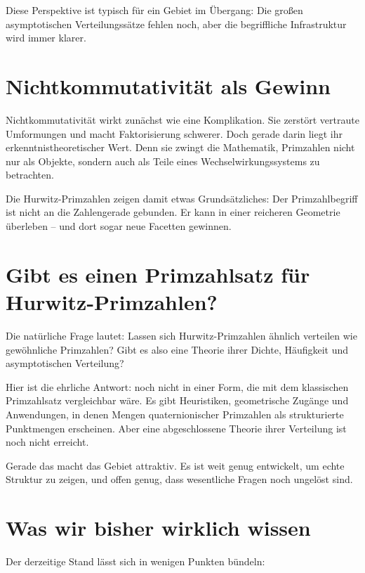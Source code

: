 \documentclass[11pt,a4paper]{article}
\begin{document}
	Diese Perspektive ist typisch für ein Gebiet im Übergang: Die großen asymptotischen Verteilungssätze fehlen noch, aber die begriffliche Infrastruktur wird immer klarer.
	
	\section*{Nichtkommutativität als Gewinn}
	
	Nichtkommutativität wirkt zunächst wie eine Komplikation. Sie zerstört vertraute Umformungen und macht Faktorisierung schwerer. Doch gerade darin liegt ihr erkenntnistheoretischer Wert. Denn sie zwingt die Mathematik, Primzahlen nicht nur als Objekte, sondern auch als Teile eines Wechselwirkungssystems zu betrachten.
	
	Die Hurwitz-Primzahlen zeigen damit etwas Grundsätzliches: Der Primzahlbegriff ist nicht an die Zahlengerade gebunden. Er kann in einer reicheren Geometrie überleben -- und dort sogar neue Facetten gewinnen.
	
	\section*{Gibt es einen Primzahlsatz für Hurwitz-Primzahlen?}
	
	Die natürliche Frage lautet: Lassen sich Hurwitz-Primzahlen ähnlich verteilen wie gewöhnliche Primzahlen? Gibt es also eine Theorie ihrer Dichte, Häufigkeit und asymptotischen Verteilung?
	
	Hier ist die ehrliche Antwort: noch nicht in einer Form, die mit dem klassischen Primzahlsatz vergleichbar wäre. Es gibt Heuristiken, geometrische Zugänge und Anwendungen, in denen Mengen quaternionischer Primzahlen als strukturierte Punktmengen erscheinen. Aber eine abgeschlossene Theorie ihrer Verteilung ist noch nicht erreicht.
	
	Gerade das macht das Gebiet attraktiv. Es ist weit genug entwickelt, um echte Struktur zu zeigen, und offen genug, dass wesentliche Fragen noch ungelöst sind.
	
	\section*{Was wir bisher wirklich wissen}
	
	Der derzeitige Stand lässt sich in wenigen Punkten bündeln:
	
\end{document}
